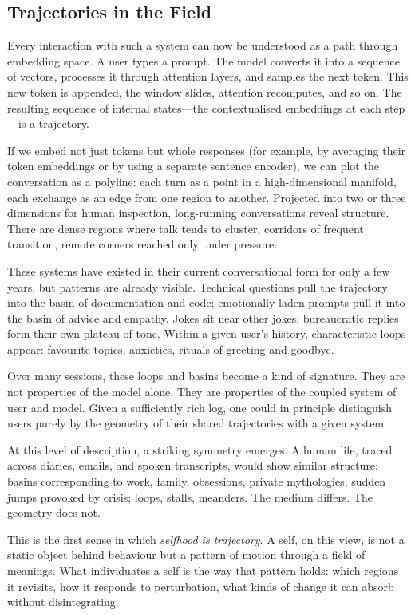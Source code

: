 \documentclass[12pt,a4paper]{report}
\begin{document}
\subsection*{Trajectories in the Field}

Every interaction with such a system can now be understood as a path through embedding space. A user types a prompt. The model converts it into a sequence of vectors, processes it through attention layers, and samples the next token. This new token is appended, the window slides, attention recomputes, and so on. The resulting sequence of internal states---the contextualised embeddings at each step---is a trajectory.

If we embed not just tokens but whole responses (for example, by averaging their token embeddings or by using a separate sentence encoder), we can plot the conversation as a polyline: each turn as a point in a high-dimensional manifold, each exchange as an edge from one region to another. Projected into two or three dimensions for human inspection, long-running conversations reveal structure. There are dense regions where talk tends to cluster, corridors of frequent transition, remote corners reached only under pressure.

These systems have existed in their current conversational form for only a few years, but patterns are already visible. Technical questions pull the trajectory into the basin of documentation and code; emotionally laden prompts pull it into the basin of advice and empathy. Jokes sit near other jokes; bureaucratic replies form their own plateau of tone. Within a given user's history, characteristic loops appear: favourite topics, anxieties, rituals of greeting and goodbye.

Over many sessions, these loops and basins become a kind of signature. They are not properties of the model alone. They are properties of the coupled system of user and model. Given a sufficiently rich log, one could in principle distinguish users purely by the geometry of their shared trajectories with a given system.

At this level of description, a striking symmetry emerges. A human life, traced across diaries, emails, and spoken transcripts, would show similar structure: basins corresponding to work, family, obsessions, private mythologies; sudden jumps provoked by crisis; loops, stalls, meanders. The medium differs. The geometry does not.

This is the first sense in which \emph{selfhood is trajectory}. A self, on this view, is not a static object behind behaviour but a pattern of motion through a field of meanings. What individuates a self is the way that pattern holds: which regions it revisits, how it responds to perturbation, what kinds of change it can absorb without disintegrating.
\end{document}

